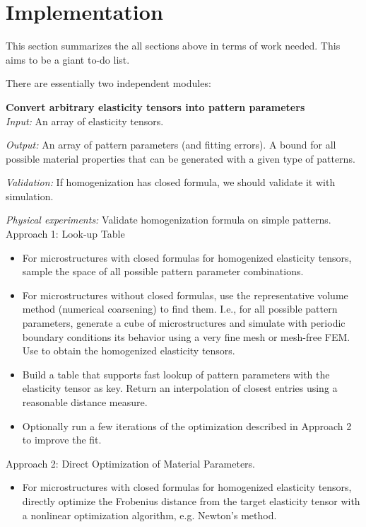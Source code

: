 \section{Implementation}
This section summarizes the all sections above in terms of work needed.  This
aims to be a giant to-do list.

There are essentially two independent modules:
\begin{description}
\item{\bf Convert arbitrary elasticity tensors into pattern parameters}\\
{\it Input:} An array of elasticity tensors.

{\it Output:} An array of pattern parameters (and fitting errors).  A bound for
all possible material properties that can be generated with a given type of patterns.

{\it Validation:} If homogenization has closed formula, we should validate it
with simulation.

{\it Physical experiments:}  Validate homogenization formula on simple patterns.\\

Approach 1: Look-up Table
\begin{itemize}
\item For microstructures with closed formulas for homogenized elasticity
    tensors, sample the space of all possible pattern parameter combinations.
\item For microstructures without closed formulas, use the representative volume
method (numerical coarsening) to find them.  I.e., for all possible pattern
parameters, generate a cube of microstructures and simulate with periodic
boundary conditions its behavior using a very fine mesh or mesh-free FEM.
Use \cite{Kharevych2009} to obtain the homogenized elasticity tensors.
\item Build a table that supports fast lookup of pattern parameters with the
    elasticity tensor as key. Return an interpolation of closest entries using a
    reasonable distance measure.
\item Optionally run a few iterations of the optimization described in Approach
      2 to improve the fit.
\end{itemize}

Approach 2: Direct Optimization of Material Parameters.
\begin{itemize}
\item For microstructures with closed formulas for homogenized elasticity
    tensors, directly optimize the Frobenius distance from the target elasticity
    tensor with a nonlinear optimization algorithm, e.g. Newton's method.
\end{itemize}


\end{description}
